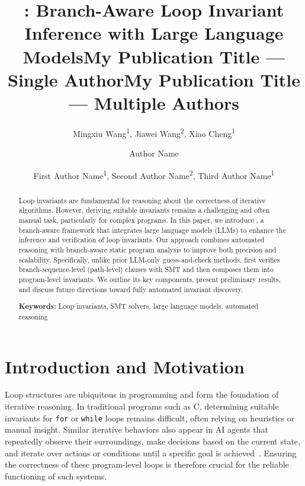 \documentclass[letterpaper]{article} %
\title{\thistool{}: Branch-Aware Loop Invariant Inference with Large Language Models}
\author{
    Mingxiu Wang\textsuperscript{\rm 1},
    Jiawei Wang\textsuperscript{\rm 2},
    Xiao Cheng\textsuperscript{\rm 1}
}
\title{My Publication Title --- Single Author}
\author {
    Author Name
}
\title{My Publication Title --- Multiple Authors}
\author {
    First Author Name\textsuperscript{\rm 1},
    Second Author Name\textsuperscript{\rm 2},
    Third Author Name\textsuperscript{\rm 1}
}
\begin{document}
\maketitle






\begin{abstract}
Loop invariants are fundamental for reasoning about the correctness of iterative algorithms. However, deriving suitable invariants remains a challenging and often manual task, particularly for complex programs. In this paper, we introduce \textsc{\thistool}, a branch-aware framework that integrates large language models (LLMs) to enhance the inference and verification of loop invariants. Our approach combines automated reasoning with branch-aware static program analysis to improve both precision and scalability. Specifically, unlike prior LLM-only guess-and-check methods, \textsc{\thistool} first verifies branch-sequence-level (path-level) clauses with SMT and then composes them into program-level invariants. We outline its key components, present preliminary results, and discuss future directions toward fully automated invariant discovery.

\noindent\textbf{Keywords:} Loop invariants, SMT solvers, large language models, automated reasoning
\end{abstract}





\section{Introduction and Motivation}
Loop structures are ubiquitous in programming and form the foundation of iterative reasoning. In traditional programs such as C, determining suitable invariants for \texttt{for} or \texttt{while} loops remains difficult, often relying on heuristics or manual insight. Similar iterative behaviors also appear in AI agents that repeatedly observe their surroundings, make decisions based on the current state, and iterate over actions or conditions until a specific goal is achieved~\cite{evertz2003loop, wu2022survey, mosqueira2023human}. Ensuring the correctness of these program-level loops is therefore crucial for the reliable functioning of such systems.  
\end{document}
